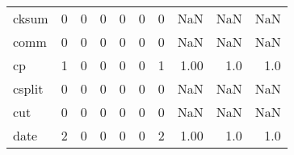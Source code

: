 \begin{longtable}{lrrrrrrrrr}
cksum     &                                       0 &                                                  0 &                                                  0 &                                                  0 &                                                  0 &                                                  0 &                                                NaN &                                    NaN &                                  NaN \\
comm      &                                       0 &                                                  0 &                                                  0 &                                                  0 &                                                  0 &                                                  0 &                                                NaN &                                    NaN &                                  NaN \\
cp        &                                       1 &                                                  0 &                                                  0 &                                                  0 &                                                  0 &                                                  1 &                                               1.00 &                                    1.0 &                                  1.0 \\
csplit    &                                       0 &                                                  0 &                                                  0 &                                                  0 &                                                  0 &                                                  0 &                                                NaN &                                    NaN &                                  NaN \\
cut       &                                       0 &                                                  0 &                                                  0 &                                                  0 &                                                  0 &                                                  0 &                                                NaN &                                    NaN &                                  NaN \\
date      &                                       2 &                                                  0 &                                                  0 &                                                  0 &                                                  0 &                                                  2 &                                               1.00 &                                    1.0 &                                  1.0 \\

\end{longtable}

